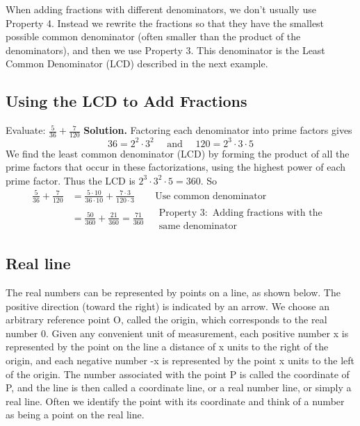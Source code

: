 When adding fractions with different denominators, we don’t usually use Property 4.
Instead we rewrite the fractions so that they have the smallest possible common denominator (often smaller than the product of the denominators), and then we use Property 3. This
denominator is the Least Common Denominator (LCD) described in the next example.

\subsection{Using the LCD to Add Fractions}

Evaluate: $\frac{5}{36}+\frac{7}{120}$
\textbf{Solution.} Factoring each denominator into prime factors gives
$$
36=2^2 \cdot 3^2 \quad \text { and } \quad 120=2^3 \cdot 3 \cdot 5
$$
We find the least common denominator (LCD) by forming the product of all the prime factors that occur in these factorizations, using the highest power of each prime factor. Thus the LCD is $2^3 \cdot 3^2 \cdot 5=360$. So
$$
\begin{aligned}
\frac{5}{36}+\frac{7}{120} & =\frac{5 \cdot 10}{36 \cdot 10}+\frac{7 \cdot 3}{120 \cdot 3} & \text { Use common denominator } \\
& =\frac{50}{360}+\frac{21}{360}=\frac{71}{360} & \begin{array}{l}
\text { Property } 3: \text { Adding fractions with the } \\
\text { same denominator }
\end{array}
\end{aligned}
$$

\subsection{Real line}

The real numbers can be represented by points on a line, as shown below. The
positive direction (toward the right) is indicated by an arrow. We choose an arbitrary
reference point O, called the origin, which corresponds to the real number 0. Given any
convenient unit of measurement, each positive number x is represented by the point on
the line a distance of x units to the right of the origin, and each negative number -x is
represented by the point x units to the left of the origin. The number associated with the
point P is called the coordinate of P, and the line is then called a coordinate line, or a
real number line, or simply a real line. Often we identify the point with its coordinate
and think of a number as being a point on the real line.

